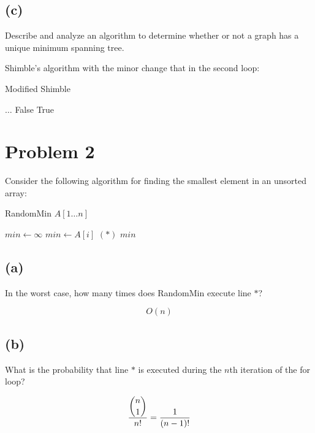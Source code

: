 \documentclass[12pt]{article}
\begin{document}
\subsection*{(c)}
Describe and analyze an algorithm to determine whether or not a graph
has a unique minimum spanning tree.

Shimble's algorithm with the minor change that in the second loop:
\begin{algorithm}
\caption{Modified Shimble}
\begin{algorithmic}
  \STATE
  \STATE $\ldots$
  \STATE
      \RETURN False
    \ENDIF
  \RETURN True
  \ENDFOR
\end{algorithmic}
\end{algorithm}


\section*{Problem 2}
Consider the following algorithm for finding the smallest element in an
unsorted array:

\begin{algorithm}
    \caption{RandomMin $A [1 \ldots n]$}
\begin{algorithmic}
  \STATE $min \leftarrow \infty$
  \STATE $min \leftarrow A [i]$ \hspace{1 cm} $(*)$
  \ENDIF
  \ENDFOR
  \RETURN $min$
\end{algorithmic}
\end{algorithm}

\subsection*{(a)}
In the worst case, how many times does RandomMin execute line \(*\)?


\begin{equation*}
O(n)
\end{equation*}

\subsection*{(b)}
What is the probability that line \(*\) is executed during the $n$th
iteration of the for loop?

\begin{equation*}
    \frac{\dbinom{n}{1}}{n!} = \frac{1}{(n-1)!}
\end{equation*}
\end{document}
